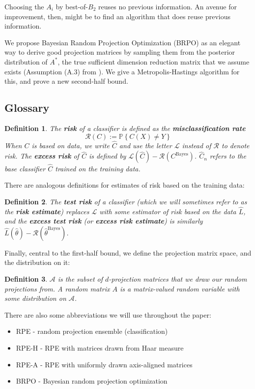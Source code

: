 \documentclass{amsart}
\newtheorem{definition}{Definition}
\newcommand\risk{\mathcal{L}}
\newcommand\rrisk{\mathcal{R}}
\begin{document}
Choosing the $A_i$ by best-of-$B_2$ reuses no previous information. An avenue for improvement, then, might be to find an algorithm that does reuse previous information.

We propose Bayesian Random Projection Optimization (BRPO) as an elegant way to derive good projection matrices by sampling them from the posterior distribution of $A^*$, the true sufficient dimension reduction matrix that we assume exists (Assumption (A.3) from \cite{CS15}). We give a Metropolis-Hastings algorithm for this, and prove a new second-half bound.

\subsection{Glossary}\label{sec:glossary}
\begin{definition}
The \textbf{risk} of a classifier is defined as the \textbf{misclassification
rate} 
\[
\rrisk(C):=\mathbb{P}\left\{ C(X)\neq Y\right\} 
\]
When $C$ is based on data, we write $\hat{C}$ and use the letter
$\risk$ instead of $\rrisk$ to denote risk. The \textbf{excess risk}
of $\hat{C}$ is defined by $\risk(\hat{C})-\rrisk(C^{\mathrm{Bayes}})$. $\hat{C}_n$ refers to the base classifier $\hat C$ trained on the training data.
\end{definition}
There are analogous definitions for estimates of risk based on the
training data:
\begin{definition}
The \textbf{test risk} of a classifier (which we will sometimes refer
to as the \textbf{risk estimate}) replaces $\risk$ with some estimator
of risk based on the data $\hat{L}$, and the \textbf{excess test
risk} (or \textbf{excess risk estimate}) is similarly $\hat{L}(\hat{\theta})-\rrisk(\hat{\theta}^{\mathrm{Bayes}})$.
\end{definition}
Finally, central to the first-half bound, we define the projection matrix space,
and the distribution on it:
\begin{definition}
$\mathcal{A}$ is the subset of $d$-projection matrices that we draw
our random projections from. A random matrix $A$ is a matrix-valued
random variable with some distribution on $\mathcal{A}$.
\end{definition}

There are also some abbreviations we will use throughout the paper:
\begin{itemize}
\item RPE - random projection ensemble (classification)
\item RPE-H - RPE with matrices drawn from Haar measure
\item RPE-A - RPE with uniformly drawn axis-aligned matrices
\item BRPO - Bayesian random projection optimization
\end{itemize}
\end{document}
